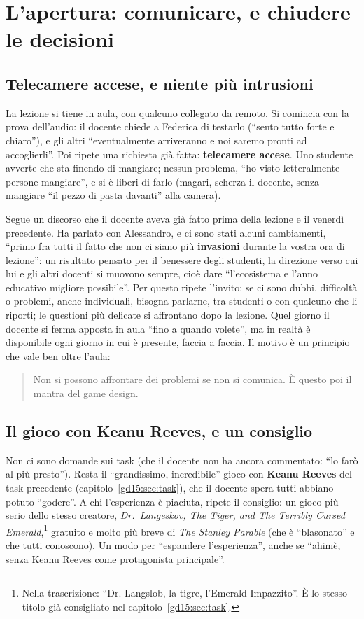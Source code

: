 \section{L'apertura: comunicare, e chiudere le decisioni}
\label{gd18:sec:apertura}

\subsection{Telecamere accese, e niente più intrusioni}

La lezione si tiene in aula, con qualcuno collegato da remoto. Si comincia con la
prova dell'audio: il docente chiede a Federica di testarlo (``sento tutto forte e
chiaro''), e gli altri ``eventualmente arriveranno e noi saremo pronti ad
accoglierli''. Poi ripete una richiesta già fatta: \textbf{telecamere accese}. Uno
studente avverte che sta finendo di mangiare; nessun problema, ``ho visto
letteralmente persone mangiare'', e si è liberi di farlo (magari, scherza il docente,
senza mangiare ``il pezzo di pasta davanti'' alla camera).

Segue un discorso che il docente aveva già fatto prima della lezione e il venerdì
precedente. Ha parlato con Alessandro, e ci sono stati alcuni cambiamenti, ``primo
fra tutti il fatto che non ci siano più \textbf{invasioni} durante la vostra ora di
lezione'': un risultato pensato per il benessere degli studenti, la direzione verso
cui lui e gli altri docenti si muovono sempre, cioè dare ``l'ecosistema e l'anno
educativo migliore possibile''. Per questo ripete l'invito: se ci sono dubbi,
difficoltà o problemi, anche individuali, bisogna parlarne, tra studenti o con
qualcuno che li riporti; le questioni più delicate si affrontano dopo la lezione.
Quel giorno il docente si ferma apposta in aula ``fino a quando volete'', ma in
realtà è disponibile ogni giorno in cui è presente, faccia a faccia. Il motivo è un
principio che vale ben oltre l'aula:
\begin{quote}
Non si possono affrontare dei problemi se non si comunica. È questo poi il mantra
del game design.
\end{quote}

\subsection{Il gioco con Keanu Reeves, e un consiglio}

Non ci sono domande sui task (che il docente non ha ancora commentato: ``lo farò al
più presto''). Resta il ``grandissimo, incredibile'' gioco con \textbf{Keanu Reeves}
del task precedente (capitolo~\ref{gd15:sec:task}), che il docente spera tutti
abbiano potuto ``godere''. A chi l'esperienza è piaciuta, ripete il consiglio: un
gioco più serio dello stesso creatore, \emph{Dr.\ Langeskov, The Tiger, and The
Terribly Cursed Emerald},\footnote{Nella trascrizione: ``Dr. Langslob, la tigre,
l'Emerald Impazzito''. È lo stesso titolo già consigliato nel
capitolo~\ref{gd15:sec:task}.} gratuito e molto più breve di \emph{The Stanley
Parable} (che è ``blasonato'' e che tutti conoscono). Un modo per ``espandere
l'esperienza'', anche se ``ahimè, senza Keanu Reeves come protagonista principale''.

